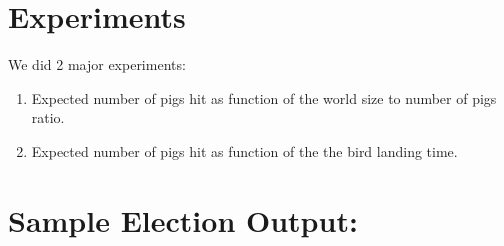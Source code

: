 \documentclass[]{article}
\begin{document}


\section{Experiments}
We did 2 major experiments:
\begin{enumerate}[1.]
\item
  Expected number of pigs hit as function of the world size to number of pigs ratio.
\item
  Expected number of pigs hit as function of the the bird landing time.
\end{enumerate} 

\section{Sample Election Output:}
\end{document}
